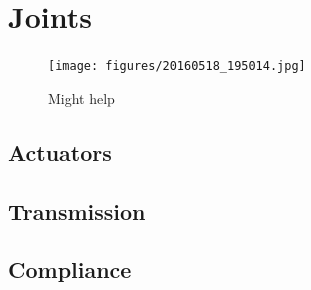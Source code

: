 \section{Joints} %
\label{sec:joints}

\begin{figure}[ht!]
  \centering
  \texttt{[image: figures/20160518\_195014.jpg]}
  \caption{Might help}
  \label{fig:figure1}
\end{figure}

  \subsection{Actuators} %
  \label{sub:actuators}


  \subsection{Transmission} %
  \label{sub:transmission}


  \subsection{Compliance} %
  \label{sub:compliance}


